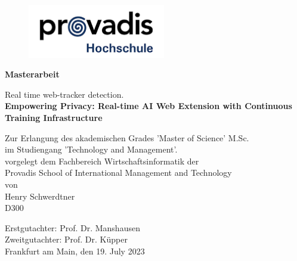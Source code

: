 \begin{titlepage}
	\strut
	\begin{center}
	\begin{figure}
  \begin{center}
	\includegraphics[width=6cm]{./images/provadis.png}
  \end{center}
	\end{figure}
			\large 
			\textbf{Masterarbeit}
		
		\vspace{0.5cm}
		\Huge
		\begin{spacing}{.9}
			Real time web-tracker detection.\\
			\vspace{0.5cm}
			\large
			\textbf{Empowering Privacy: Real-time AI Web Extension with Continuous Training Infrastructure} \\
		\end{spacing}
		\vspace{3cm}
		\small 
	    Zur Erlangung des akademischen Grades 'Master of Science' M.Sc. \\
      im Studiengang 'Technology and Management'. \\
		\vspace{0.7cm}
		\small
			vorgelegt dem Fachbereich Wirtschaftsinformatik der \\
		Provadis School of International Management and Technology \\
		von \\
		\vspace{0.7cm}
		Henry Schwerdtner\\
		\vspace{0.1cm}
		D300\\
		\vspace{1cm}
	 	\end{center}
		\begin{flushleft}
		Erstgutachter: \hspace{1.29cm} Prof. Dr. Manshausen \\
    Zweitgutachter: \hspace{1cm} Prof. Dr. Küpper \\
		\vspace{1.5cm}
		Frankfurt am Main, den 19. July 2023
		\end{flushleft}
\end{titlepage}

\shipout\null
